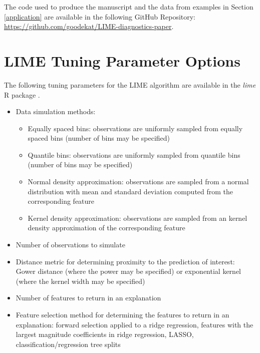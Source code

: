 \documentclass[AMS,STIX2COL]{WileyNJD-v2}\usepackage[]{graphicx}\usepackage[]{color}
\begin{document}
The code used to produce the manuscript and the data from examples in Section \ref{application} are available in the following GitHub Repository: \href{https://github.com/goodekat/LIME-diagnostics-paper}{https://github.com/goodekat/LIME-diagnostics-paper}.



\newpage

\appendix

\section{LIME Tuning Parameter Options} \label{lime-details}

The following tuning parameters for the LIME algorithm are available in the \emph{lime} R package \citep{pedersen:2020}.

\begin{itemize}

\item Data simulation methods:

\begin{itemize}
\item Equally spaced bins: observations are uniformly sampled from equally spaced bins (number of bins may be specified)
\item Quantile bins: observations are uniformly sampled from quantile bins (number of bins may be specified)
\item Normal density approximation: observations are sampled from a normal distribution with mean and standard deviation computed from the corresponding feature
\item Kernel density approximation: observations are sampled from an kernel density approximation of the corresponding feature
\end{itemize}

\item Number of observations to simulate

\item Distance metric for determining proximity to the prediction of interest: Gower distance (where the power may be specified) or exponential kernel (where the kernel width may be specified)

\item Number of features to return in an explanation

\item Feature selection method for determining the features to return in an explanation: forward selection applied to a ridge regression, features with the largest magnitude coefficients in ridge regression, LASSO, classification/regression tree splits

\end{itemize}
\end{document}
